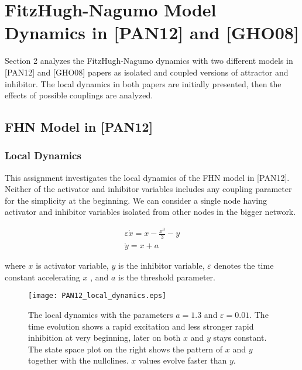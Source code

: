 \section{FitzHugh-Nagumo Model Dynamics in [PAN12] and [GHO08]}

Section 2 analyzes the FitzHugh-Nagumo dynamics with two different models in [PAN12] and [GHO08] papers as isolated and coupled versions of attractor and inhibitor. The local dynamics in both papers are initially presented, then the effects of possible couplings are analyzed. 

\subsection{FHN Model in [PAN12]}

\subsubsection{Local Dynamics}

This assignment investigates the local dynamics of the FHN model in [PAN12]. Neither of the activator and inhibitor variables includes any coupling parameter for the simplicity at the beginning. We can consider a single node having activator and inhibitor variables isolated from other nodes in the bigger network. 
   
\begin{subequations} \begin{align} \varepsilon  \dot{x} = x - \frac{x^3}{3} -y   \label{eqn: frobenius 6}\\  \dot{y} = x+a \label{eqn: frobenius 7}   \end{align} 
\end{subequations}

where $x$ is activator variable, $y$ is the inhibitor variable, $\varepsilon$ denotes the time constant accelerating $x$ , and $a$ is the threshold parameter. 


\begin{figure}[h!]
	\centering
	\texttt{[image: PAN12\_local\_dynamics.eps]}
	\caption{The local dynamics with the parameters $a=1.3$ and $\varepsilon = 0.01$. The time evolution shows a rapid excitation and less stronger rapid inhibition at very beginning, later on both $x$ and $y$ stays constant. The state space plot on the right shows the pattern of $x$ and $y$ together with the nullclines. $x$ values evolve faster than $y$.}
\end{figure}

